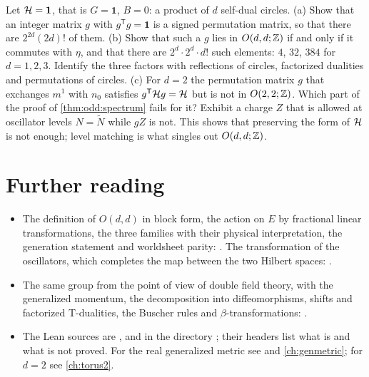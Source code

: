 \begin{exercise}\label{ex:odd:fixed}
Let $\mathcal{H}=\mathbf 1$, that is $G=\mathbf 1$, $B=0$: a product of $d$ self-dual circles.
(a) Show that an integer matrix $g$ with $g^{\mathsf T}g=\mathbf 1$ is a signed permutation
matrix, so that there are $2^{2d}(2d)!$ of them. (b) Show that such a $g$ lies in $O(d,d;\mathbb{Z})$
if and only if it commutes with $\eta$, and that there are $2^d\cdot2^d\cdot d!$ such
elements: $4$, $32$, $384$ for $d=1,2,3$. Identify the three factors with reflections of
circles, factorized dualities and permutations of circles. (c) For $d=2$ the permutation
matrix $g$ that exchanges $m^1$ with $n_0$ satisfies $g^{\mathsf T}\mathcal{H} g=\mathcal{H}$ but is not in
$O(2,2;\mathbb{Z})$. Which part of the proof of \cref{thm:odd:spectrum} fails for it? Exhibit a
charge $Z$ that is allowed at oscillator levels $N=\tilde N$ while $gZ$ is not. This shows
that preserving the form of $\mathcal{H}$ is not enough; level matching is what singles out
$O(d,d;\mathbb{Z})$.
\end{exercise}

\section*{Further reading}
\begin{itemize}[leftmargin=*,itemsep=2pt]
\item The definition of $O(d,d)$ in block form, the action on $E$ by fractional linear
 transformations, the three families with their physical interpretation, the generation
 statement and worldsheet parity: . The transformation of
 the oscillators, which completes the map between the two Hilbert spaces:
 .
\item The same group from the point of view of double field theory, with the generalized
 momentum, the decomposition into diffeomorphisms, shifts and factorized T-dualities, the
 Buscher rules and $\beta$-transformations: .
\item The Lean sources are ,  and
  in the directory ; their headers list
 what is and what is not proved. For the real generalized metric see 
 and \cref{ch:genmetric}; for $d=2$ see \cref{ch:torus2}.
\end{itemize}

